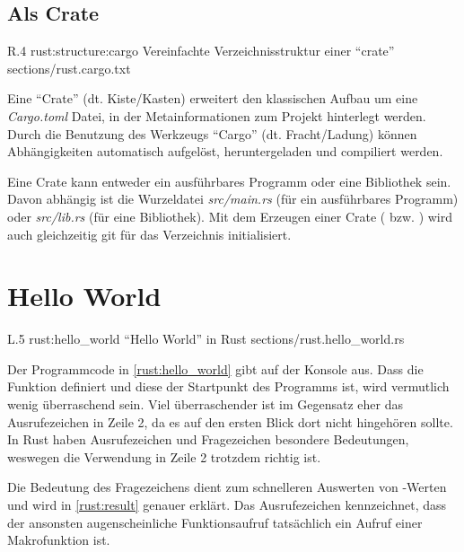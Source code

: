 \clearpage
\subsection{Als Crate}
\label{rust:structure:crate}

\begin{wrapfigure}{R}{.4\textwidth}
	\rustcincludeml
		{rust:structure:cargo}
		{Vereinfachte Verzeichnisstruktur einer \enquote{crate}}
		{sections/rust.cargo.txt}
\end{wrapfigure}

Eine \enquote{Crate} (dt. Kiste/Kasten) erweitert den klassischen Aufbau um eine \textit{Cargo.toml} Datei, in der Metainformationen zum Projekt hinterlegt werden.
Durch die Benutzung des Werkzeugs \enquote{Cargo} (dt. Fracht/Ladung) können Abhängigkeiten automatisch aufgelöst, heruntergeladen und compiliert werden.

Eine Crate kann entweder ein ausführbares Programm oder eine Bibliothek sein.
Davon abhängig ist die Wurzeldatei \textit{src/main.rs} (für ein ausführbares Programm) oder \textit{src/lib.rs} (für eine Bibliothek).
Mit dem Erzeugen einer Crate ( bzw. ) wird auch gleichzeitig \gls{git} für das Verzeichnis initialisiert.

\section{Hello World}


\begin{wrapfigure}{L}{.5\textwidth}
	\rustcinclude
		{rust:hello_world}
		{\enquote{Hello World} in Rust}
		{sections/rust.hello_world.rs}
\end{wrapfigure}

Der Programmcode in \autoref{rust:hello_world} gibt auf der Konsole  aus.
Dass  die Funktion  definiert und diese der Startpunkt des Programms ist, wird vermutlich wenig überraschend sein.
Viel überraschender ist im Gegensatz eher das Ausrufezeichen in Zeile 2, da es auf den ersten Blick dort nicht hingehören sollte.
In Rust haben Ausrufezeichen und Fragezeichen besondere Bedeutungen, weswegen die Verwendung in Zeile 2 trotzdem richtig ist.

Die Bedeutung des Fragezeichens dient zum schnelleren Auswerten von -Werten und wird in \autoref{rust:result} genauer erklärt.
Das Ausrufezeichen kennzeichnet, dass der ansonsten augenscheinliche Funktionsaufruf tatsächlich ein Aufruf einer Makrofunktion ist.

